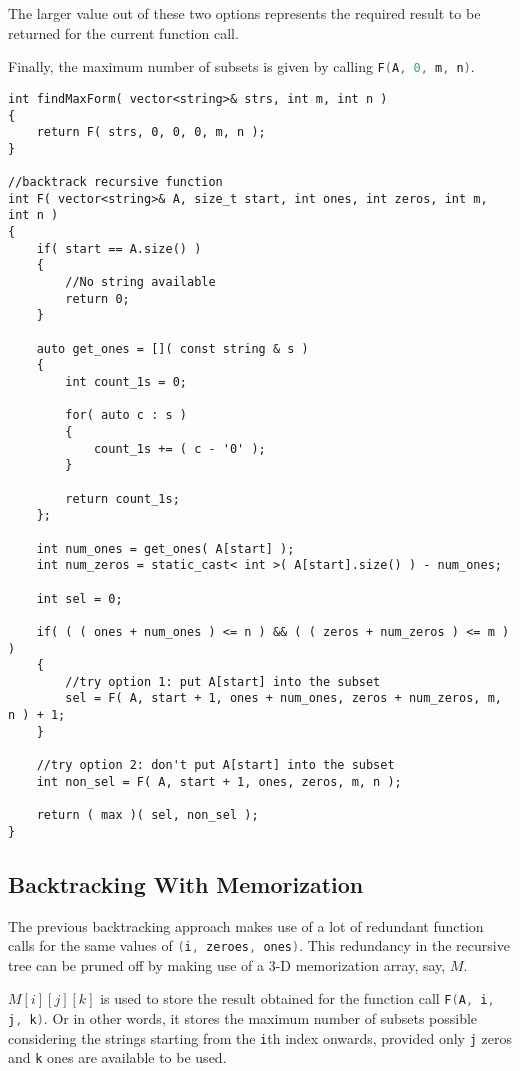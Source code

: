 The larger value out of these two options represents the required result to be returned for the current function call.

Finally, the maximum number of subsets is given by calling \lstinline[language=C++, basicstyle=\small\ttfamily, keywordstyle=\bfseries\color{green!40!black}]|F(A, 0, m, n)|.

\setcounter{lstlisting}{0}
\begin{lstlisting}[style=customc, caption={Backtrack}]
int findMaxForm( vector<string>& strs, int m, int n )
{
    return F( strs, 0, 0, 0, m, n );
}

//backtrack recursive function
int F( vector<string>& A, size_t start, int ones, int zeros, int m, int n )
{
    if( start == A.size() )
    {
        //No string available
        return 0;
    }

    auto get_ones = []( const string & s )
    {
        int count_1s = 0;

        for( auto c : s )
        {
            count_1s += ( c - '0' );
        }

        return count_1s;
    };

    int num_ones = get_ones( A[start] );
    int num_zeros = static_cast< int >( A[start].size() ) - num_ones;

    int sel = 0;

    if( ( ( ones + num_ones ) <= n ) && ( ( zeros + num_zeros ) <= m ) )
    {
        //try option 1: put A[start] into the subset
        sel = F( A, start + 1, ones + num_ones, zeros + num_zeros, m, n ) + 1;
    }

    //try option 2: don't put A[start] into the subset
    int non_sel = F( A, start + 1, ones, zeros, m, n );

    return ( max )( sel, non_sel );
}
\end{lstlisting}

\subsection{Backtracking With Memorization}
The previous backtracking approach makes use of a lot of redundant function calls for  the same values of \lstinline[language=C++, basicstyle=\small\ttfamily, keywordstyle=\bfseries\color{green!40!black}]|(i, zeroes, ones)|. This redundancy in the recursive tree can be pruned off by making use of a 3-D memorization array, say, $M$.

$M[i][j][k]$ is used to store the result obtained for the function call \lstinline[language=C++, basicstyle=\small\ttfamily, keywordstyle=\bfseries\color{green!40!black}]|F(A, i, j, k)|. Or in other words, it stores the maximum number of subsets possible considering the strings starting from the \lstinline[language=C++, basicstyle=\small\ttfamily, keywordstyle=\bfseries\color{green!40!black}]|i|th index onwards, provided only \lstinline[language=C++, basicstyle=\small\ttfamily, keywordstyle=\bfseries\color{green!40!black}]|j| zeros and \lstinline[language=C++, basicstyle=\small\ttfamily, keywordstyle=\bfseries\color{green!40!black}]|k| ones are available to be used.

